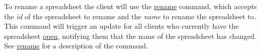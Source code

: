 To rename a spreadsheet the client will use the \hyperref[sec:message:rename]{rename}
command, which accepts the \emph{id} of the spreadsheet to rename and the \emph{name} 
to rename the spreadsheet to. This command will trigger an update for all clients who 
currently have the spreadsheet \hyperref[sec:message:open]{open}, notifying them that 
the name of the spreadsheet has changed. See \hyperref[sec:message:rename]{rename} for 
a description of the command.